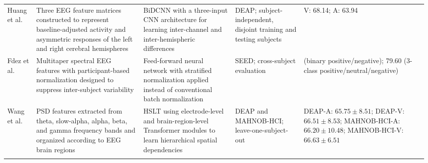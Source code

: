 \documentclass{WileyMSP-template}
\newcommand{\lightrowsep}{%
    \arrayrulecolor{lightrowgray}%
    \specialrule{0.30pt}{3.5pt}{3.5pt}%
    \arrayrulecolor{black}%
}
\begin{document}
\begin{table}
\begin{tabularx}{\textheight}{
>{\raggedright\arraybackslash}p{3.15cm}
>{\raggedright\arraybackslash}X
>{\raggedright\arraybackslash}X
>{\raggedright\arraybackslash}p{3.45cm}
>{\raggedright\arraybackslash}p{5.0cm}}
Huang et al. \cite{huang2021bidcnn} &
Three EEG feature matrices constructed to represent baseline-adjusted activity
and asymmetric responses of the left and right cerebral hemispheres &
BiDCNN with a three-input CNN architecture for learning inter-channel
and inter-hemispheric differences &
DEAP; subject-independent, disjoint training and testing subjects &
V: 68.14;
A: 63.94 \\
\lightrowsep

Fdez et al. \cite{fdez2021stratified} &
Multitaper spectral EEG features with participant-based normalization
designed to suppress inter-subject variability &
Feed-forward neural network with stratified normalization applied
instead of conventional batch normalization &
SEED; cross-subject evaluation &
91.60 (binary positive/negative);
79.60 (3-class positive/neutral/negative) \\
\lightrowsep

Wang et al. \cite{wang2022hslt} &
PSD features extracted from theta, slow-alpha, alpha, beta, and gamma
frequency bands and organized according to EEG brain regions &
HSLT using electrode-level and brain-region-level Transformer modules
to learn hierarchical spatial dependencies &
DEAP and MAHNOB-HCI; leave-one-subject-out &
DEAP-A: $65.75 \pm 8.51$;
DEAP-V: $66.51 \pm 8.53$;
MAHNOB-HCI-A: $66.20 \pm 10.48$;
MAHNOB-HCI-V: $66.63 \pm 6.51$ \\

\midrule
\multicolumn{5}{r}{\textit{Continued on next page}} \\

\bottomrule
\end{tabularx}

\end{table}
\end{document}
